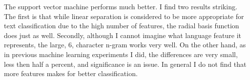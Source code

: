 \documentclass[11pt]{article}
\begin{document}
The support vector machine performs much better. I find two results striking. The first is that while linear separation is considered to be more appropriate for text classification due to the high number of features, the radial basis function does just as well. Secondly, although I cannot imagine what language feature it represents, the large, 6, character n-gram works very well. On the other hand, as in previous machine learning experiments I did, the differences are very small, less then half a percent, and significance is an issue. In general I do not find that more features makes for better classification.



\end{document}
